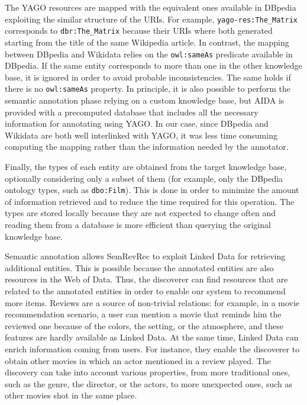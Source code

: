 The YAGO resources are mapped with the equivalent ones available in DBpedia exploiting the similar structure of the URIs. For example, \texttt{yago-res:The\_Matrix} corresponds to \texttt{dbr:The\_Matrix} because their URIs where both generated starting from the title of the same Wikipedia article. In contrast, the mapping between DBpedia and Wikidata relies on the \texttt{owl:sameAs} predicate available in DBpedia. If the same entity corresponds to more than one in the other knowledge base, it is ignored in order to avoid probable inconsistencies. The same holds if there is no \texttt{owl:sameAs} property. In principle, it is also possible to perform the semantic annotation phase relying on a custom knowledge base, but AIDA is provided with a precomputed database that includes all the necessary information for annotating using YAGO. In our case, since DBpedia and Wikidata are both well interlinked with YAGO, it was less time consuming computing the mapping rather than the information needed by the annotator.

Finally, the types of each entity are obtained from the target knowledge base, optionally considering only a subset of them (for example, only the DBpedia ontology types, such as \texttt{dbo:Film}). This is done in order to minimize the amount of information retrieved and to reduce the time required for this operation. The types are stored locally because they are not expected to change often and reading them from a database is more efficient than querying the original knowledge base.

Semantic annotation allows SemRevRec to exploit Linked Data for retrieving additional entities. This is possible because the annotated entities are also resources in the Web of Data. Thus, the discoverer can find resources that are related to the annotated entities in order to enable our system to recommend more items. Reviews are a source of non-trivial relations: for example, in a movie recommendation scenario, a user can mention a movie that reminds him the reviewed one because of the colors, the setting, or the atmosphere, and these features are hardly available as Linked Data. At the same time, Linked Data can enrich information coming from users. For instance, they enable the discoverer to obtain other movies in which an actor mentioned in a review played. The discovery can take into account various properties, from more traditional ones, such as the genre, the director, or the actors, to more unexpected ones, such as other movies shot in the same place.

